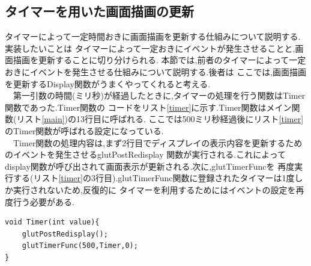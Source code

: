 \documentclass[a4j]{jarticle}
\begin{document}
    \subsection{タイマーを用いた画面描画の更新}
    タイマーによって一定時間おきに画面描画を更新する仕組みについて説明する.実装したいことは
    タイマーによって一定おきにイベントが発生させることと,画面描画を更新することに切り分けられる.
    本節では,前者のタイマーによって一定おきにイベントを発生させる仕組みについて説明する.後者は
    ここでは,画面描画を更新するDisplay関数がうまくやってくれると考える.\\
    　第一引数の時間(ミリ秒)が経過したときに,タイマーの処理を行う関数はTimer関数であった.Timer関数の
    コードをリスト\ref{timer}に示す.Timer関数はメイン関数(リスト\ref{main})の13行目に呼ばれる.
    ここでは500ミリ秒経過後にリスト\ref{timer}のTimer関数が呼ばれる設定になっている.\\
    　Timer関数の処理内容は,まず2行目でディスプレイの表示内容を更新するためのイベントを発生させるglutPostRedisplay
    関数が実行される.これによってdisplay関数が呼び出されて画面表示が更新される.次に,glutTimerFuncを
    再度実行する(リスト\ref{timer}の3行目).glutTimerFunc関数に登録されたタイマーは1度しか実行されないため,反復的に
    タイマーを利用するためにはイベントの設定を再度行う必要がある.
    
    \begin{lstlisting}[basicstyle=\ttfamily\footnotesize, frame=single,label=timer,caption=Timer関数]
void Timer(int value){
    glutPostRedisplay();
    glutTimerFunc(500,Timer,0);
}
            \end{lstlisting} 
\end{document}
